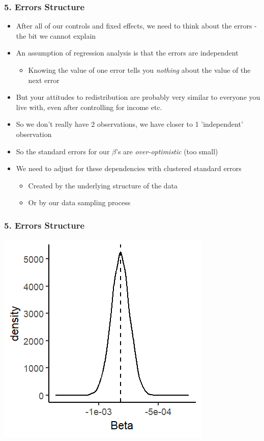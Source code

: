 \documentclass[xcolor=x11names,compress]{beamer}\usepackage[]{graphicx}\usepackage[]{color}
\makeatletter
\def\maxwidth{ %
  \ifdim\Gin@nat@width>\linewidth
    \linewidth
  \else
    \Gin@nat@width
  \fi
}
\newenvironment{knitrout}{}{} %
\renewcommand{\(}{\begin{columns}}
\renewcommand{\)}{\end{columns}}
\newcommand{\<}[1]{\begin{column}{#1}}
\renewcommand{\>}{\end{column}}
\makeatother
\begin{document}
\begin{frame}
\frametitle{5. Errors Structure}
\begin{itemize}
\item After all of our controls and fixed effects, we need to think about the errors - the bit we cannot explain
\pause
\item An assumption of regression analysis is that the errors are independent
\begin{itemize}
\item Knowing the value of one error tells you \textit{nothing} about the value of the next error
\end{itemize}
\item But your attitudes to redistribution are probably very similar to everyone you live with, even after controlling for income etc.
\pause
\item So we don't really have 2 observations, we have closer to 1 'independent' observation
\item So the standard errors for our $\beta$'s are \textit{over-optimistic} (too small)
\pause
\item We need to adjust for these dependencies with clustered standard errors
\begin{itemize}
\item Created by the underlying structure of the data
\item Or by our data sampling process
\end{itemize}
\end{itemize}
\end{frame}

\begin{frame}
\frametitle{5. Errors Structure}
\begin{knitrout}
\color{fgcolor}
\includegraphics[width=\maxwidth]{figure/beta_dist_errors_4-1} 

\end{knitrout}
\end{frame}
\end{document}
